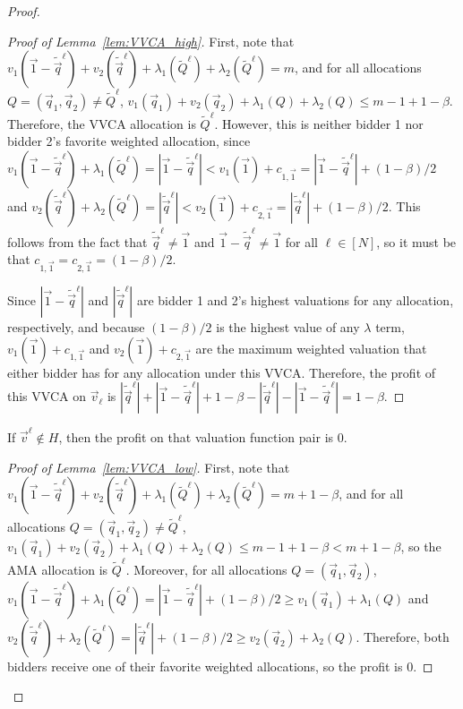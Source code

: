 \begin{proof}
\begin{proof}[Proof of Lemma~\ref{lem:VVCA_high}]
First, note that $v_1(\vec{1} - \tilde{\vec{q}}^\ell) + v_2(\tilde{\vec{q}}^\ell) +\lambda_1(\tilde{Q}^\ell) + \lambda_2(\tilde{Q}^\ell) = m$, and for all allocations $Q = \left(\vec{q}_1, \vec{q}_2\right) \not = \tilde{Q}^\ell$, $v_1(\vec{q}_1) + v_2(\vec{q}_2) + \lambda_1(Q) + \lambda_2(Q) \leq m-1 + 1-\beta$. Therefore, the VVCA allocation is $\tilde{Q}^\ell$. However, this is neither bidder 1 nor bidder 2's favorite weighted allocation, since $v_1(\vec{1} - \tilde{\vec{q}}^\ell) + \lambda_1(\tilde{Q}^\ell) = |\vec{1} - \tilde{\vec{q}}^\ell| < v_1(\vec{1}) + c_{1,\vec{1}} = |\vec{1} - \tilde{\vec{q}}^\ell| + (1-\beta) /2$ and $v_2(\tilde{\vec{q}}^\ell) + \lambda_2(\tilde{Q}^\ell) = |\tilde{\vec{q}}^\ell|< v_2(\vec{1}) + c_{2,\vec{1}} = |\tilde{\vec{q}}^\ell| + (1-\beta) /2$. This follows from the fact that $\tilde{\vec{q}}^\ell \not = \vec{1}$ and $\vec{1} - \tilde{\vec{q}}^\ell \not = \vec{1}$ for all $\ell \in [N]$, so it must be that $c_{1,\vec{1}} = c_{2,\vec{1}} = (1 - \beta)/2.$

Since $|\vec{1} - \tilde{\vec{q}}^\ell|$ and $|\tilde{\vec{q}}^\ell|$ are bidder 1 and 2's highest valuations for any allocation, respectively, and because $(1-\beta)/2$ is the highest value of any $\lambda$ term, $v_1(\vec{1}) + c_{1,\vec{1}}$ and $v_2(\vec{1}) + c_{2,\vec{1}}$ are the maximum weighted valuation that either bidder has for any allocation under this VVCA. Therefore, the profit of this VVCA on $\vec{v}_\ell$ is $|\tilde{\vec{q}}^\ell| + |\vec{1} - \tilde{\vec{q}}^\ell| + 1-\beta - |\tilde{\vec{q}}^\ell| - |\vec{1} - \tilde{\vec{q}}^\ell| = 1-\beta$.
\end{proof}

\begin{lemma}\label{lem:VVCA_low} If $\vec{v}^\ell \not \in H$, then the profit on that valuation function pair is 0.
\end{lemma}

\begin{proof}[Proof of Lemma~\ref{lem:VVCA_low}]
First, note that $v_1(\vec{1} - \tilde{\vec{q}}^\ell) + v_2(\tilde{\vec{q}}^\ell) +\lambda_1(\tilde{Q}^\ell) + \lambda_2(\tilde{Q}^\ell) = m+1-\beta$, and for all allocations $Q = \left(\vec{q}_1, \vec{q}_2\right) \not= \tilde{Q}^\ell$, $v_1(\vec{q}_1) + v_2(\vec{q}_2) + \lambda_1(Q) + \lambda_2(Q) \leq m-1 + 1-\beta < m + 1-\beta$, so the AMA allocation is $\tilde{Q}^\ell$. Moreover, for all allocations $Q = (\vec{q}_1, \vec{q}_2)$, $v_1(\vec{1} - \tilde{\vec{q}}^\ell) + \lambda_1(\tilde{Q}^\ell) = |\vec{1} - \tilde{\vec{q}}^\ell| + (1-\beta)/2 \geq v_1(\vec{q}_1) + \lambda_1(Q)$ and  $v_2(\tilde{\vec{q}}^\ell) + \lambda_2(\tilde{Q}^\ell) = |\tilde{\vec{q}}^\ell| + (1-\beta)/2 \geq v_2(\vec{q}_2) + \lambda_2(Q)$. Therefore, both bidders receive one of their favorite weighted allocations, so the profit is 0.
\end{proof}
\end{proof}